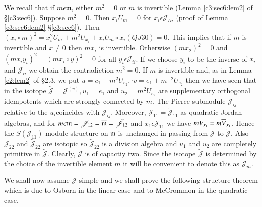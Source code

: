 We recall that if $m\epsilon \mathfrak{m}$, either $m^{2}=0$ or $m$ is
invertible (Lemma \ref{c3:sec6:lem2} of \S \ref{c3:sec6}). Suppose $m^{2}=0$. Then $x_iU_m=0$ for
$x_i\epsilon \mathscr{J}_{Iii}$ (proof of Lemma \ref{c3:sec6:lem2}
\S \ref{c3:sec6}). Then
$(x_i\circ m)^{2}=x^{2}_iU_m+m^{2}U_{x_i}+x_iU_m\circ x_i(QJ
30)=0$. This implies that if $m$ is invertible and $x\neq 0$ then
$mx_i$ is invertible. Otherwise $(m x_2)^{2}=0$ and $(m x_iy_i)^{2}=(m
x_i\circ y)^{2}=0$ for all $y_i\epsilon \mathscr{J}_{ii}$. If we
choose $y_i$ to be the inverse of $x_i$ and $\mathscr{J}_{ii}$ we
obtain the contradiction $m^{2}=0$. If $m$ is invertible and, as in
Lemma \ref{c2:lem2} of \S 2.3. we put $u=c_1+m^{2}U_{e_2},\cdot
v=e_1+m^{-2}U_{e_2}$ then we have seen that in the isotope
$\tilde{\mathscr{J}}=\mathscr{J}^{(v)},u_1=e_1$ and $u_2=m^{2}U_{e_2}$ are
supplementary orthogonal idempotents which are strongly connected by
$m$. The Pierce submodule $\mathscr{J}_{ij}$ relative to the
$u_i$\pageoriginale coincides with $\mathscr{J}_{ij}$. Moreover,
$\mathscr{J}_{11}=\tilde{\mathscr{J}}_{11}$ as quadratic Jordan algebras,
and for $m\epsilon
\mathfrak{m}=\mathscr{J}_{12}=\overline{\mathfrak{m}}=\tilde{\mathscr{J}}_{12}$
and $x_1\epsilon \mathscr{J}_{11}$ we have
$mV_{x_1}=m\overline{V}_{x_1}$. Hence the $S(\mathscr{J}_{11})$ module
structure on $\mathfrak{m}$ is unchanged in passing from
$\mathscr{J}$ to $\tilde{\mathscr{J}}$. Also $\mathscr{J}_{22}$ and
$\tilde{\mathscr{J}}_{22}$ are isotopic so $\tilde{\mathscr{J}}_{22}$ is a
division algebra and $u_1$ and $u_2$ are completely primitive in
$\tilde{\mathscr{J}}$. Clearly, $\mathscr{J}$ is of capactiy two. Since
the isotope $\tilde{\mathscr{J}}$ is determined by the choice of the
invertible element $m$ it will be convenient to denote this as
$\mathscr{J}_m$.

We shall now assume $\mathscr{J}$ simple and we shall prove the
following structure theorem which is due to Osborn \cite{Osborn1} in the linear
case and to McCrommon in the quadratic case.

